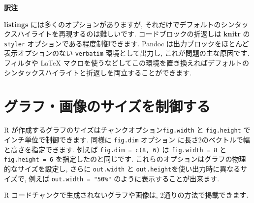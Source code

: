 \documentclass[
  11pt,
  lualatex,
  ja=standard]{bxjsreport}
\newenvironment{infobox}[1]{\begin{itemize}\renewcommand{\labelitemi}{\raisebox{-.7\height}[0pt][0pt]{%
  {\setkeys{Gin}{width=3em,keepaspectratio}\texttt{[image: \_latex/\_img/\#1]}}}}
  \setlength{\fboxsep}{1em}
  \begin{greyblock}
  \item
  }{\end{greyblock}\end{itemize}
}
\begin{document}
\begin{infobox}{memo}
\textbf{訳注}

\textbf{listings} には多くのオプションがありますが, それだけでデフォルトのシンタックスハイライトを再現するのは難しいです. コードブロックの折返しは \textbf{knitr} の \texttt{styler} オプションである程度制御できます. Pandoc は出力ブロックをほとんど表示オプションのない \texttt{verbatim} 環境として出力し, これが問題の主な原因です. フィルタや LaTeX マクロを使うなどしてこの環境を置き換えればデフォルトのシンタックスハイライトと折返しを両立することができます.

\end{infobox}

\hypertarget{figure-size}{%
\section{グラフ・画像のサイズを制御する}\label{figure-size}}

R が作成するグラフのサイズはチャンクオプション\texttt{fig.width}  と \texttt{fig.height} でインチ単位で制御できます. 同様に \texttt{fig.dim} オプション に長さ2のベクトルで幅と高さを指定できます. 例えば \texttt{fig.dim = c(8, 6)} は \texttt{fig.width = 8} と \texttt{fig.height = 6} を指定したのと同じです. これらのオプションはグラフの物理的なサイズを設定し, さらに \texttt{out.width} と \texttt{out.height}を使い出力時に異なるサイズで, 例えば \texttt{out.width = "50\%"} のように表示することが出来ます.

R コードチャンクで生成されないグラフや画像は, 2通りの方法で掲載できます.
\end{document}
